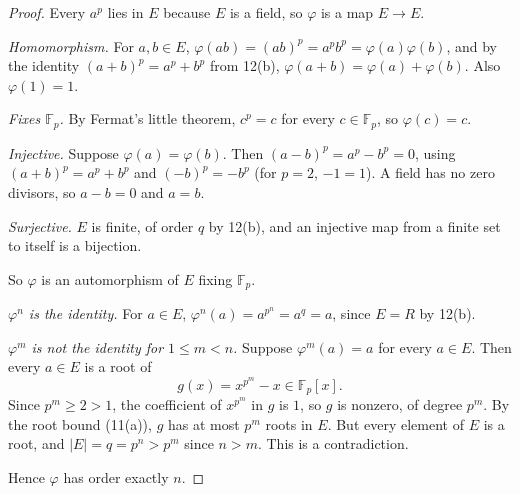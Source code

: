 \documentclass[11pt]{article}
\begin{document}
\begin{proof}
Every $a^p$ lies in $E$ because $E$ is a field, so $\varphi$ is a map
$E \to E$.

\emph{Homomorphism.} For $a, b \in E$, $\varphi(ab) = (ab)^p = a^p b^p
= \varphi(a)\varphi(b)$, and by the identity $(a+b)^p = a^p + b^p$ from 12(b),
$\varphi(a+b) = \varphi(a) + \varphi(b)$. Also $\varphi(1) = 1$.

\emph{Fixes $\mathbb{F}_p$.} By Fermat's little theorem, $c^p = c$ for every
$c \in \mathbb{F}_p$, so $\varphi(c) = c$.

\emph{Injective.} Suppose $\varphi(a) = \varphi(b)$. Then
$(a-b)^p = a^p - b^p = 0$, using $(a+b)^p = a^p + b^p$ and $(-b)^p = -b^p$
(for $p = 2$, $-1 = 1$). A field has no zero divisors, so $a - b = 0$ and
$a = b$.

\emph{Surjective.} $E$ is finite, of order $q$ by 12(b), and an injective map
from a finite set to itself is a bijection.

So $\varphi$ is an automorphism of $E$ fixing $\mathbb{F}_p$.

\emph{$\varphi^n$ is the identity.} For $a \in E$,
$\varphi^n(a) = a^{p^n} = a^q = a$, since $E = R$ by 12(b).

\emph{$\varphi^m$ is not the identity for $1 \leq m < n$.} Suppose
$\varphi^m(a) = a$ for every $a \in E$. Then every $a \in E$ is a root of
\[
  g(x) = x^{p^m} - x \in \mathbb{F}_p[x].
\]
Since $p^m \geq 2 > 1$, the coefficient of $x^{p^m}$ in $g$ is $1$, so $g$ is
nonzero, of degree $p^m$. By the root bound (11(a)), $g$ has at most $p^m$
roots in $E$. But every element of $E$ is a root, and $|E| = q = p^n > p^m$
since $n > m$. This is a contradiction.

Hence $\varphi$ has order exactly $n$.
\end{proof}
\end{document}
